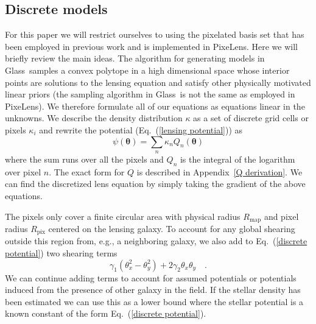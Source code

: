 \documentclass[onecolumn,galley]{mn2e}
\newcommand{\Glass}{{\sc Glass}}
\newcommand{\PixeLens}{{\sc PixeLens}}
\newcommand{\Rmap}{\ensuremath{R_\mathrm{map}}}
\newcommand{\Rpix}{\ensuremath{R_\mathrm{pix}}}
\newcommand{\eqnref}[1] {Eq.~(\ref{#1})}
\newcommand{\appref}[1] {Appendix~\ref{#1}}
\renewcommand{\vec}[1]{\ensuremath{\boldsymbol{#1}}}
\begin{document}
\subsection{Discrete models}

For this paper we will restrict ourselves to using the pixelated basis set that
has been employed in previous work and is implemented in \PixeLens. Here we
will briefly review the main ideas. The algorithm for generating models in
\Glass\ samples a convex polytope in a high dimensional space whose interior
points are solutions to the lensing equation and satisfy other physically
motivated linear priors (the sampling algorithm in \Glass\ is not the same as
employed in \PixeLens).  We therefore formulate all of our equations as
equations linear in the unknowns. We describe the density distribution $\kappa$
as a set of discrete grid cells or pixels $\kappa_i$ and rewrite the potential
(\eqnref{lensing potential}) as
%
\begin{equation}
  \psi(\vec\theta) = \sum_n \kappa_n Q_n(\vec\theta)
  \label{discrete potential}
\end{equation}
%
where the sum runs over all the pixels and $Q_n$ is the integral of the logarithm
over pixel $n$. The exact form for $Q$ is described in \appref{Q derivation}.
We can find the discretized lens equation by simply taking the gradient of the
above equations. 

The pixels only cover a finite circular area with physical radius $\Rmap$ and
pixel radius $\Rpix$ centered on the lensing galaxy. To account for any global
shearing outside this region from, e.g., a neighboring galaxy, we also add to
\eqnref{discrete potential} two shearing terms
%
\begin{equation}
\label{shear}
\gamma_1(\theta_x^2 - \theta_y^2) + 2\gamma_2\theta_x\theta_y\quad.
\end{equation}
%
We can continue adding terms to account for assumed potentials or potentials
induced from the presence of other galaxy in the field. If the stellar density
has been estimated we can use this as a lower bound where the stellar potential
is a known constant of the form \eqnref{discrete potential}.
%
%
\end{document}
